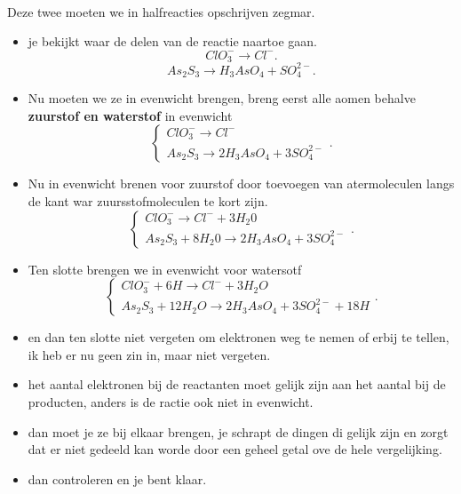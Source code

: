 \documentclass{report}
\begin{document}
\\ Deze twee moeten we in halfreacties opschrijven zegmar.
\begin{itemize}
	\item je bekijkt waar de delen van de reactie naartoe gaan.
		\[
		ClO_{3} ^{-} \to Cl^{-} 
		.\] 
		\[
		As_{2} S_{3} \to H_{3} AsO_{4} + SO_{4} ^{2-} 
		.\] 
	\item Nu moeten we ze in evenwicht brengen, breng eerst alle aomen behalve \textbf{zuurstof en waterstof} in evenwicht
		\[
		\begin{cases}
			ClO_{3} ^{-} \to Cl^{-} \\ 
			As_{2} S_{3} \to 2 H_{3} AsO_{4} + 3SO_{4} ^{2-} 
		\end{cases}
		.\] 
	\item Nu in evenwicht brenen voor zuurstof door toevoegen van atermoleculen langs de kant war zuursstofmoleculen te kort zijn.
		\[
		\begin{cases}
		ClO_{3} ^{-} \to Cl^{-} +3H_{2} 0 \\ 
		As_{2} S_{3} +8H_{2} 0 \to 2H_{3} AsO_{4} + 3SO_{4} ^{2-} 
		\end{cases}
		.\] 
	\item Ten slotte brengen we in evenwicht voor watersotf
		\[
		\begin{cases}
		ClO_{3} ^{-} + 6H \to Cl^{-} + 3H_{2} O \\ 
		As_{2} S_{3} +12H_{2} O \to 2H_{3} AsO_{4} +3SO_{4} ^{2-} +18H
		\end{cases}
		.\] 
	\item en dan ten slotte niet vergeten om elektronen weg te nemen of erbij te tellen, ik heb er nu geen zin in, maar niet vergeten.
	\item het aantal elektronen bij de reactanten moet gelijk zijn aan het aantal bij de producten, anders is de ractie ook niet in evenwicht.
		
\end{itemize}

\begin{itemize}
	\item dan moet je ze bij elkaar brengen, je schrapt de dingen di gelijk zijn en zorgt dat er niet gedeeld kan worde door een geheel getal ove de hele vergelijking. 
	\item dan controleren en je bent klaar.
\end{itemize}
\end{document}
